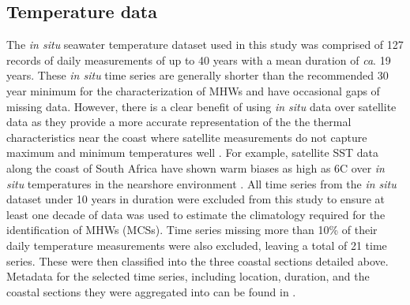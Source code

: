 \documentclass[a4paper,10pt,review]{elsarticle}
\begin{document}
\subsection{Temperature data}
The \emph{in situ} seawater temperature dataset used in this study was comprised of 127 records of daily measurements of up to 40 years with a mean duration of \emph{ca}. 19 years. These \emph{in situ} time series are generally shorter than the recommended 30 year minimum for the characterization of MHWs \citep{Hobday2016} and have occasional gaps of missing data. However, there is a clear benefit of using \emph{in situ} data over satellite data as they provide a more accurate representation of the the thermal characteristics near the coast where satellite measurements do not capture maximum and minimum temperatures well \citep[e.g.][]{Smale2009, Castillo2010}. For example, satellite SST data along the coast of South Africa have shown warm biases as high as 6\degree C over \emph{in situ} temperatures in the nearshore environment \citet{Smit2013}. All time series from the \emph{in situ} dataset under 10 years in duration were excluded from this study to ensure at least one decade of data was used to estimate the climatology required for the identification of MHWs (MCSs). Time series missing more than 10\% of their daily temperature measurements were also excluded, leaving a total of 21 time series. These were then classified into the three coastal sections detailed above. Metadata for the selected time series, including location, duration, and the coastal sections they were aggregated into can be found in .
\end{document}
